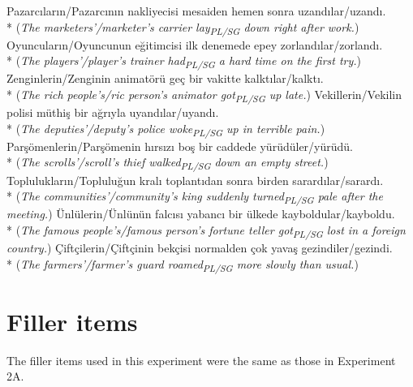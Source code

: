 \ex Pazarc{\i}lar{\i}n/Pazarc{\i}n{\i}n nakliyecisi mesaiden hemen sonra uzand{\i}lar/uzand{\i}.\\*
({\it The marketers'/marketer's carrier lay\textsubscript{PL/SG} down right after work.})
\ex Oyuncular{\i}n/Oyuncunun e\u{g}itimcisi ilk denemede epey zorland{\i}lar/zorland{\i}.\\*
({\it The players'/player's trainer had\textsubscript{PL/SG} a hard time on the first try.})
\ex Zenginlerin/Zenginin animat\"{o}r\"{u} ge\c{c} bir vakitte kalkt{\i}lar/kalkt{\i}.\\*
({\it The rich people's/ric person's animator got\textsubscript{PL/SG} up late.})
\ex Vekillerin/Vekilin polisi m\"{u}thi\c{s} bir a\u{g}r{\i}yla uyand{\i}lar/uyand{\i}.\\*
({\it The deputies'/deputy's police woke\textsubscript{PL/SG} up in terrible pain.})
\ex Par\c{s}\"{o}menlerin/Par\c{s}\"{o}menin h{\i}rs{\i}z{\i} bo\c{s} bir caddede y\"{u}r\"{u}d\"{u}ler/y\"{u}r\"{u}d\"{u}.\\*
({\it The scrolls'/scroll's thief walked\textsubscript{PL/SG} down an empty street.})
\ex Topluluklar{\i}n/Toplulu\u{g}un kral{\i} toplant{\i}dan sonra birden sarard{\i}lar/sarard{\i}.\\*
({\it The communities'/community's king suddenly turned\textsubscript{PL/SG} pale after the meeting.})
\ex \"{U}nl\"{u}lerin/\"{U}nl\"{u}n\"{u}n falc{\i}s{\i} yabanc{\i} bir \"{u}lkede kayboldular/kayboldu.\\*
({\it The famous people's/famous person's fortune teller got\textsubscript{PL/SG} lost in a foreign country.})
\ex \c{C}ift\c{c}ilerin/\c{C}ift\c{c}inin bek\c{c}isi normalden \c{c}ok yava\c{s} gezindiler/gezindi.\\*
({\it The farmers'/farmer's guard roamed\textsubscript{PL/SG} more slowly than usual.})
\z

\section{Filler items}
The filler items used in this experiment were the same as those in Experiment 2A. 

\newpage 
